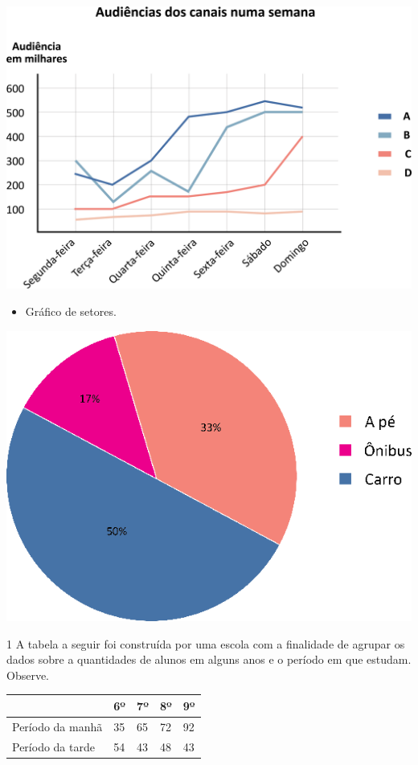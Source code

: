 {\includegraphics[width=\textwidth]{media/image40.png}

\pagebreak
\begin{itemize}
\item
  Gráfico de setores.
\end{itemize}

\includegraphics[width=\textwidth]{media/image41.png}
}


\num{1} A tabela a seguir foi construída por uma escola com a finalidade de agrupar os
dados sobre a quantidades de alunos em alguns anos e o período em que
estudam. Observe.

\begin{longtable}[]{@{}lllll@{}}
\toprule
& 6º & 7º & 8º & 9º\tabularnewline
\midrule
\endhead
Período da manhã & 35 & 65 & 72 & 92\tabularnewline
Período da tarde & 54 & 43 & 48 & 43\tabularnewline
\bottomrule
\end{longtable}


